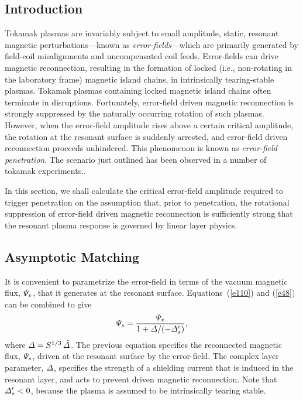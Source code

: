 \documentclass[12pt,prb,aps]{revtex4-1}
\begin{document}
\subsection{Introduction}
Tokamak plasmas are invariably subject to small amplitude, static, resonant magnetic perturbations---known as
{\em error-fields}---which are primarily generated by field-coil misalignments and uncompensated coil feeds. 
Error-fields can drive magnetic reconnection, resulting in the formation of  locked (i.e., non-rotating in the laboratory
frame) magnetic island chains, in intrinsically tearing-stable plasmas. Tokamak plasmas
containing locked magnetic island chains often terminate in disruptions.\cite{wes1} Fortunately, error-field driven magnetic reconnection is strongly
suppressed by the naturally occurring rotation of such plasmas. However, when the error-field amplitude rises
above a certain critical amplitude, the rotation at the resonant surface is suddenly arrested, and error-field driven reconnection proceeds
unhindered. This phenomenon is known as {\em error-field penetration}.\cite{rf1993,rf1998} The scenario
just outlined has been observed in a number of tokamak experiments.\cite{scoville, hender,
fishpool,wolf, wolfe,howell,menard,wang1,wang2}. 

In this section, we shall calculate the critical error-field amplitude required to trigger penetration on the assumption that,
prior to penetration, the rotational suppression of error-field driven magnetic reconnection is sufficiently strong that
the resonant plasma response is governed by linear layer physics.\cite{rf1993,rf1998,cole}

\subsection{Asymptotic Matching}
It is convenient to parametrize the error-field in terms of the vacuum magnetic flux, ${\mit\Psi}_v$, that it generates at the resonant surface. 
Equations~(\ref{e110}) and (\ref{e48}) can be combined to give
\begin{equation}\label{e383}
{\mit\Psi}_s= \frac{{\mit\Psi}_v}{1+{\mit\Delta}/(-{\mit\Delta}_s')},
\end{equation}
where ${\mit\Delta} = S^{1/3}\,\hat{\mit\Delta}$. 
The previous equation specifies the reconnected magnetic flux, ${\mit\Psi}_s$, driven at the resonant surface by the error-field. The complex layer parameter, ${\mit\Delta}$, specifies the strength of a shielding current
that is induced in the resonant layer, and acts to prevent driven magnetic reconnection. Note that ${\mit\Delta}_s'<0$, because the
plasma is assumed to be intrinsically tearing stable. 
\end{document}
